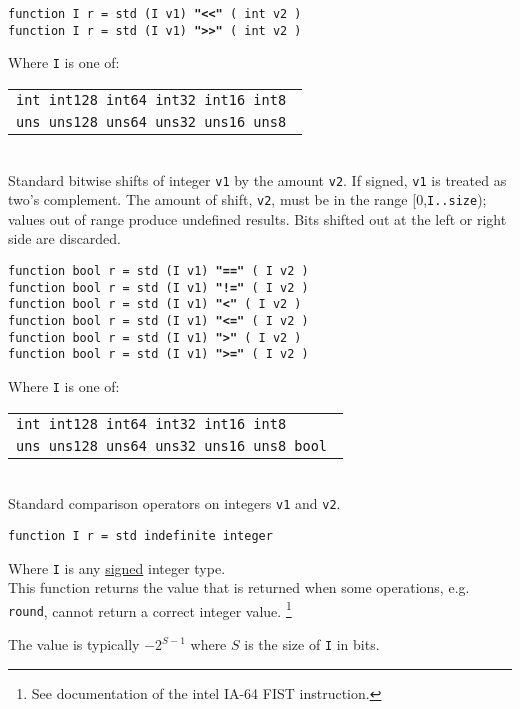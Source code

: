 \documentclass[12pt]{article}
\newcommand{\ttkey}[1]{{\tt \bfseries #1}}
\newenvironment{indpar}[1][0.3in]%
	{\begin{list}{}%
		     {\setlength{\itemsep}{0in}%
		      \setlength{\topsep}{0in}%
		      \setlength{\parsep}{1ex}%
		      \setlength{\labelwidth}{#1}%
		      \setlength{\leftmargin}{#1}%
		      \addtolength{\leftmargin}{\labelsep}}%
	 \item}%
	{\end{list}}
\begin{document}
{\tt function I r = std (I v1) \ttkey{"<{}<"} ( int v2 )} \\
{\tt function I r = std (I v1) \ttkey{">{}>"} ( int v2 )}
\begin{indpar}
Where {\tt I} is one of:
	\begin{tabular}[t]{l}
	\tt int  int128 int64  int32  int16 int8 \\
	\tt uns  uns128 uns64  uns32  uns16 uns8 \\
	\end{tabular}
\\[1ex]
Standard bitwise shifts of integer {\tt v1} by the amount {\tt v2}.
If signed, {\tt v1} is treated as two's complement.
The amount of shift, {\tt v2}, must be in the range
[0,{\tt I..size}); values out of range produce undefined results.
Bits shifted out at the left or
right side are discarded.
\end{indpar}

{\tt function bool r = std (I v1) \ttkey{"=="} ( I v2 )} \\
{\tt function bool r = std (I v1) \ttkey{"!="} ( I v2 )} \\
{\tt function bool r = std (I v1) \ttkey{"<"} ( I v2 )} \\
{\tt function bool r = std (I v1) \ttkey{"<="} ( I v2 )} \\
{\tt function bool r = std (I v1) \ttkey{">"} ( I v2 )} \\
{\tt function bool r = std (I v1) \ttkey{">="} ( I v2 )}
\begin{indpar}
Where {\tt I} is one of:
	\begin{tabular}[t]{l}
	\tt int  int128 int64  int32  int16 int8 \\
	\tt uns  uns128 uns64  uns32  uns16 uns8 bool \\
	\end{tabular}
\\[1ex]
Standard comparison operators on integers {\tt v1} and {\tt v2}.
\end{indpar}

{\tt function I r = std indefinite integer}%
\label{INDEFINITE-INTEGER}
\begin{indpar}
Where {\tt I} is any \underline{signed} integer type.
\\[1ex]
This function returns the value that is returned when
some operations, e.g. {\tt round},
cannot return a correct integer value.%
\footnote{See documentation of the intel IA-64 FIST instruction.}

The value is typically $-2^{S-1}$ where $S$ is the size of {\tt I} in bits.
\end{indpar}
	
\end{document}
